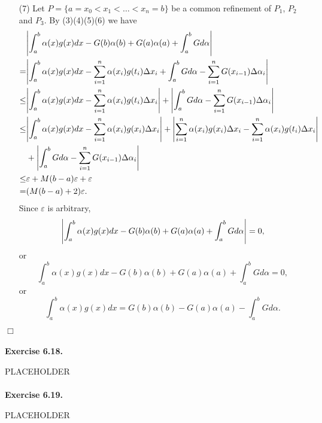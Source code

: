 \documentclass{article}
\begin{document}
\begin{enumerate}
  \item[(7)]
  Let $P = \{a = x_0 < x_1 < \ldots < x_n = b\}$
  be a common refinement of $P_1$, $P_2$ and $P_3$.
  By (3)(4)(5)(6) we have
  \begin{align*}
    &\abs{ \int_{a}^{b} \alpha(x)g(x)dx
      - G(b)\alpha(b) + G(a)\alpha(a) + \int_{a}^{b}G d\alpha } \\
    =& \abs{
      \int_{a}^{b} \alpha(x)g(x)dx - \sum_{i=1}^{n} \alpha(x_i)g(t_i)\Delta x_i
      +
      \int_{a}^{b}G d\alpha - \sum_{i=1}^{n} G(x_{i-1}) \Delta\alpha_i } \\
    \leq& \abs{
      \int_{a}^{b} \alpha(x)g(x)dx - \sum_{i=1}^{n} \alpha(x_i)g(t_i)\Delta x_i }
      +
      \abs{ \int_{a}^{b}G d\alpha - \sum_{i=1}^{n} G(x_{i-1}) \Delta\alpha_i } \\
    \leq& \abs{
      \int_{a}^{b} \alpha(x)g(x)dx - \sum_{i=1}^{n} \alpha(x_i)g(x_i)\Delta x_i }
      +
      \abs{ \sum_{i=1}^{n} \alpha(x_i)g(x_i)\Delta x_i
        - \sum_{i=1}^{n} \alpha(x_i)g(t_i)\Delta x_i } \\
      &+
      \abs{ \int_{a}^{b}G d\alpha - \sum_{i=1}^{n} G(x_{i-1}) \Delta\alpha_i } \\
    \leq& \varepsilon + M(b-a)\varepsilon + \varepsilon \\
    =& (M(b-a) + 2)\varepsilon.
  \end{align*}
  Since $\varepsilon$ is arbitrary,
  \[
    \abs{ \int_{a}^{b} \alpha(x)g(x)dx
      - G(b)\alpha(b) + G(a)\alpha(a) + \int_{a}^{b}G d\alpha }=0,
  \]
  or
  \[
    \int_{a}^{b} \alpha(x)g(x)dx
      - G(b)\alpha(b) + G(a)\alpha(a) + \int_{a}^{b}G d\alpha = 0,
  \]
  or
  \[
    \int_{a}^{b} \alpha(x)g(x)dx
    = G(b)\alpha(b) - G(a)\alpha(a) - \int_{a}^{b}G d\alpha.
  \]
\end{enumerate}
$\Box$ \\\\






\textbf{Exercise 6.18.}

PLACEHOLDER \\\\






\textbf{Exercise 6.19.}

PLACEHOLDER \\\\



\end{document}
